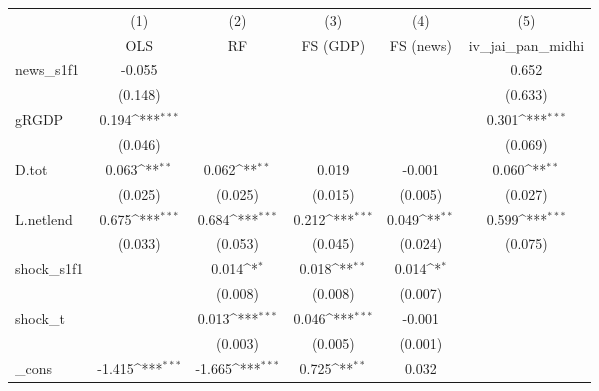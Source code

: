{
\def\sym#1{\ifmmode^{#1}\else\(^{#1}\)\fi}
\begin{tabular}{l*{5}{c}}
\toprule
            &\multicolumn{1}{c}{(1)}&\multicolumn{1}{c}{(2)}&\multicolumn{1}{c}{(3)}&\multicolumn{1}{c}{(4)}&\multicolumn{1}{c}{(5)}\\
            &\multicolumn{1}{c}{OLS}&\multicolumn{1}{c}{RF}&\multicolumn{1}{c}{FS (GDP)}&\multicolumn{1}{c}{FS (news)}&\multicolumn{1}{c}{iv\_jai\_pan\_midhi}\\
\midrule
news\_s1f1   &      -0.055         &                     &                     &                     &       0.652         \\
            &     (0.148)         &                     &                     &                     &     (0.633)         \\
\addlinespace
gRGDP       &       0.194\sym{***}&                     &                     &                     &       0.301\sym{***}\\
            &     (0.046)         &                     &                     &                     &     (0.069)         \\
\addlinespace
D.tot       &       0.063\sym{**} &       0.062\sym{**} &       0.019         &      -0.001         &       0.060\sym{**} \\
            &     (0.025)         &     (0.025)         &     (0.015)         &     (0.005)         &     (0.027)         \\
\addlinespace
L.netlend   &       0.675\sym{***}&       0.684\sym{***}&       0.212\sym{***}&       0.049\sym{**} &       0.599\sym{***}\\
            &     (0.033)         &     (0.053)         &     (0.045)         &     (0.024)         &     (0.075)         \\
\addlinespace
shock\_s1f1  &                     &       0.014\sym{*}  &       0.018\sym{**} &       0.014\sym{*}  &                     \\
            &                     &     (0.008)         &     (0.008)         &     (0.007)         &                     \\
\addlinespace
shock\_t     &                     &       0.013\sym{***}&       0.046\sym{***}&      -0.001         &                     \\
            &                     &     (0.003)         &     (0.005)         &     (0.001)         &                     \\
\addlinespace
\_cons      &      -1.415\sym{***}&      -1.665\sym{***}&       0.725\sym{**} &       0.032         &                     \\

\end{tabular}}

